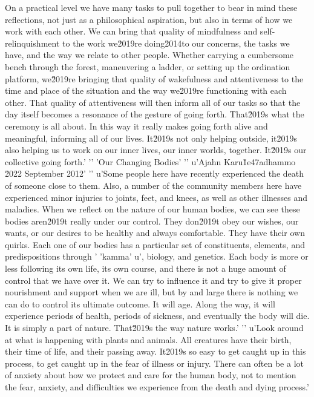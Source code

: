 On a practical level we have many tasks to pull together to bear in mind these reflections, not just as a philosophical aspiration, but also in terms of how we work with each other. We can bring that quality of mindfulness and self-relinquishment to the work we\u2019re doing\u2014to our concerns, the tasks we have, and the way we relate to other people. Whether carrying a cumbersome bench through the forest, maneuvering a ladder, or setting up the ordination platform, we\u2019re bringing that quality of wakefulness and attentiveness to the time and place of the situation and the way we\u2019re functioning with each other. That quality of attentiveness will then inform all of our tasks so that the day itself becomes a resonance of the gesture of going forth. That\u2019s what the ceremony is all about. In this way it really makes going forth alive and meaningful, informing all of our lives. It\u2019s not only helping outside, it\u2019s also helping us to work on our inner lives, our inner worlds, together. It\u2019s our collective going forth.'
'\n'
'Our Changing Bodies'
'\n'
u'Ajahn Karu\u1e47adhammo \u2022 September 2012'
'\n'
u'Some people here have recently experienced the death of someone close to them. Also, a number of the community members here have experienced minor injuries to joints, feet, and knees, as well as other illnesses and maladies. When we reflect on the nature of our human bodies, we can see these bodies aren\u2019t really under our control. They don\u2019t obey our wishes, our wants, or our desires to be healthy and always comfortable. They have their own quirks. Each one of our bodies has a particular set of constituents, elements, and predispositions through '
'kamma'
u', biology, and genetics. Each body is more or less following its own life, its own course, and there is not a huge amount of control that we have over it. We can try to influence it and try to give it proper nourishment and support when we are ill, but by and large there is nothing we can do to control its ultimate outcome. It will age. Along the way, it will experience periods of health, periods of sickness, and eventually the body will die. It is simply a part of nature. That\u2019s the way nature works.'
'\n'
u'Look around at what is happening with plants and animals. All creatures have their birth, their time of life, and their passing away. It\u2019s so easy to get caught up in this process, to get caught up in the fear of illness or injury. There can often be a lot of anxiety about how we protect and care for the human body, not to mention the fear, anxiety, and difficulties we experience from the death and dying process.'
